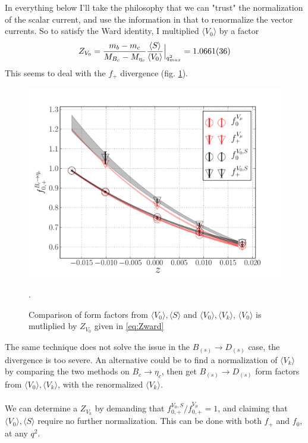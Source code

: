 \\ \\
In everything below I'll take the philosophy that we can "trust" the normalization of the scalar current, and use the information in that to renormalize the vector currents. So to satisfy the Ward identity, I multiplied $\langle V_0 \rangle$ by a factor
\begin{align}
	Z_{V_0} = {m_b-m_c \over M_{B_c}-M_{\eta_c} } { \langle S \rangle \over \langle V_0 \rangle }\Big\vert_{q^2_{max}} = 1.0661(36)
	\label{eq:Zward}
\end{align}
This seems to deal with the $f_+$ divergence (fig. \ref{fig:Zward}).
\begin{figure}[htb!]
\centering
\includegraphics[scale=0.65]{images/NRQCD/Bcetac_bothways.pdf}
\caption{Comparison of form factors from $\langle V_0 \rangle,\langle S \rangle $ and $\langle V_0\rangle,\langle V_k\rangle$, $\langle V_0\rangle$ is mutliplied by $Z_{V_0}$ given in \eqref{eq:Zward}}.
\label{fig:Zward}
\end{figure}
The same technique does not solve the issue in the $B_{(s)}\to D_{(s)}$ case, the divergence is too severe. An alternative could be to find a normalization of $\langle V_k \rangle$ by comparing the two methods on $B_c\to\eta_c$, then get $B_{(s)}\to D_{(s)}$ form factors from $\langle V_0 \rangle, \langle V_k \rangle$, with the renormalized $\langle V_k \rangle$.
\\ \\
We can determine a $Z_{V_k}$ by demanding that $f_{0,+}^{V_0,S}/f_{0,+}^{V_{\mu}}=1$, and claiming that $\langle V_0 \rangle, \langle S \rangle$ require no further normalization. This can be done with both $f_+$ and $f_0$, at any $q^2$. 
